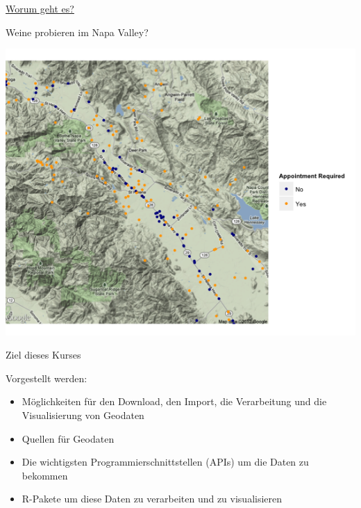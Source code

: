 \documentclass[ignorenonframetext,]{beamer}
\begin{document}
\begin{frame}{\href{http://blog.revolutionanalytics.com/2012/07/making-beautiful-maps-in-r-with-ggmap.html}{Worum
geht es?}}

\begin{block}{Weine probieren im Napa Valley?}

\includegraphics{figure/Wine_nappa.png}

\end{block}

\end{frame}

\begin{frame}{Ziel dieses Kurses}

\begin{block}{Vorgestellt werden:}

\begin{itemize}
\item
  Möglichkeiten für den Download, den Import, die Verarbeitung und die
  Visualisierung von Geodaten 
\item
  Quellen für Geodaten
\item
  Die wichtigsten Programmierschnittstellen (APIs) um die Daten zu
  bekommen
\item
  R-Pakete um diese Daten zu verarbeiten und zu visualisieren
\end{itemize}

\end{block}

\end{frame}
\end{document}
